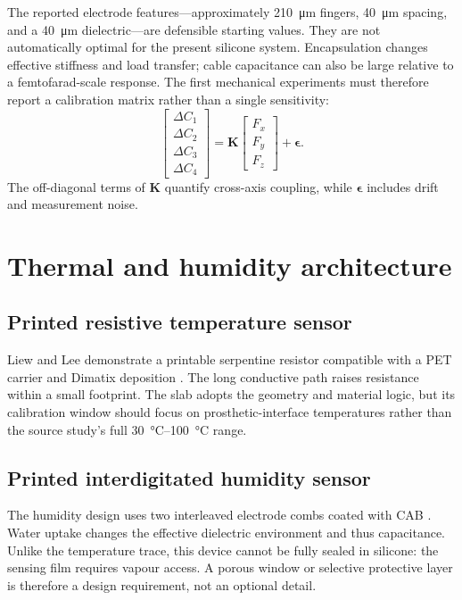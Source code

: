 \documentclass[10pt,twocolumn]{article}
\begin{document}
The reported electrode features---approximately
\SI{210}{\micro\metre} fingers, \SI{40}{\micro\metre} spacing, and a
\SI{40}{\micro\metre} dielectric---are defensible starting values. They are not
automatically optimal for the present silicone system. Encapsulation changes
effective stiffness and load transfer; cable capacitance can also be large
relative to a femtofarad-scale response. The first mechanical experiments must
therefore report a calibration matrix rather than a single sensitivity:
\[
\begin{bmatrix}
\Delta C_1\\ \Delta C_2\\ \Delta C_3\\ \Delta C_4
\end{bmatrix}
=
\mathbf{K}
\begin{bmatrix}
F_x\\F_y\\F_z
\end{bmatrix}
+\boldsymbol{\epsilon}.
\]
The off-diagonal terms of \(\mathbf{K}\) quantify cross-axis coupling, while
\(\boldsymbol{\epsilon}\) includes drift and measurement noise.

\section{Thermal and humidity architecture}

\subsection{Printed resistive temperature sensor}

Liew and Lee demonstrate a printable serpentine resistor compatible with a PET
carrier and Dimatix deposition \cite{liew2020}. The long conductive path raises
resistance within a small footprint. The slab adopts the geometry and material
logic, but its calibration window should focus on prosthetic-interface
temperatures rather than the source study's full
\SIrange{30}{100}{\degreeCelsius} range.

\subsection{Printed interdigitated humidity sensor}

The humidity design uses two interleaved electrode combs coated with CAB
\cite{aitmammar2020}. Water uptake changes the effective dielectric environment
and thus capacitance. Unlike the temperature trace, this device cannot be fully
sealed in silicone: the sensing film requires vapour access. A porous window or
selective protective layer is therefore a design requirement, not an optional
detail.
\end{document}
